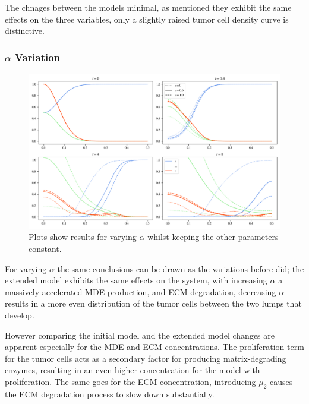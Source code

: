 The chnages between the models minimal, as mentioned they exhibit the same effects on the three variables, only a slightly raised tumor cell density curve is distinctive.

\subsubsection*{$\alpha$ Variation}
\begin{figure}[h!]
    \centering
    \includegraphics[width=\textwidth]{resources/images/prolif_alpha_variation.png}
    \caption{Plots show results for varying $\alpha$ whilst keeping the other parameters constant.}
    \label{fig:prolif_alpha_variation}
\end{figure}

For varying $\alpha$ the same conclusions can be drawn as the variations before did; the extended model exhibits the same effects on the system, with increasing $\alpha$ a massively accelerated MDE production, and ECM degradation, decreasing $\alpha$ results in a more even distribution of the tumor cells between the two lumps that develop. 

However comparing the initial model and the extended model changes are apparent especially for the MDE and ECM concentrations. The proliferation term for the tumor cells acts as a secondary factor for producing matrix-degrading enzymes, resulting in an even higher concentration for the model with proliferation. The same goes for the ECM concentration, introducing $\mu_2$ causes the ECM degradation process to slow down substantially. 

